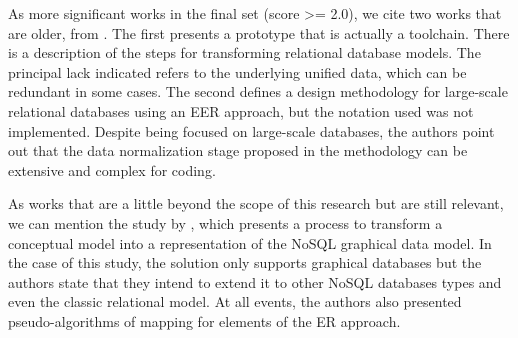 As more significant works in the final set (score >= 2.0), we cite two works that are older, from \cite{Rosenthal:1994, Teorey:1986}.
The first presents a prototype that is actually a toolchain.
There is a description of the steps for transforming relational database models.
The principal lack indicated refers to the underlying unified data, which can be redundant in some cases.
The second defines a design methodology for large-scale relational databases using an EER approach, but the notation used was not implemented.
Despite being focused on large-scale databases, the authors point out that the data normalization stage proposed in the methodology can be extensive and complex for coding.


As works that are a little beyond the scope of this research but are still relevant, we can mention the study by \cite{deSousa:2018}, which presents a process to transform a conceptual model into a representation of the NoSQL graphical data model.
In the case of this study, the solution only supports graphical databases but the authors state that they intend to extend it to other NoSQL databases types and even the classic relational model.
At all events, the authors also presented pseudo-algorithms of mapping for elements of the ER approach.


